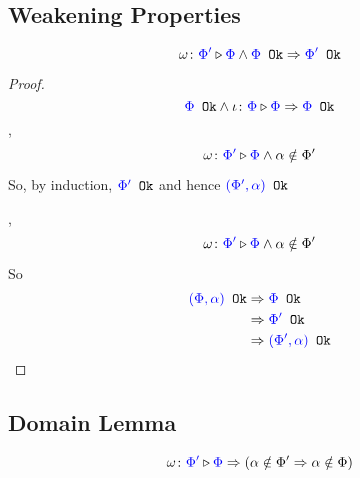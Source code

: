 \documentclass{report}
\begin{document}
        \subsection{Weakening Properties}
        \begin{property}

        \begin{equation}
            \omega \colon {\color{blue}\Phi'} \triangleright {\color {blue} \Phi} \wedge {\color{blue} \Phi} \texttt{ Ok}\Rightarrow {\color{blue} \Phi'} \texttt{ Ok}
        \end{equation}
        \end{property}
        \begin{framed}
            
            \begin{proof}
    
            \subcase{$\i$}
            $${\color{blue} \Phi} \texttt{ Ok} \wedge\iota \colon {\color{blue}\Phi} \triangleright {\color {blue} \Phi} \Rightarrow {\color{blue} \Phi} \texttt{ Ok}$$ 
            \subcase{$\w\pi$}
            \bi,
            \begin{equation}
                \omega \colon {\color{blue}\Phi'} \triangleright {\color {blue} \Phi} \wedge \alpha\notin\Phi'
            \end{equation}
    
            So, by induction, ${\color{blue} \Phi'} \texttt{ Ok}$ and hence ${\color{blue} (\Phi', \alpha)} \texttt{ Ok}$
    
            \subcase{$\w\x$}
            \bi, 
            \begin{equation}
                \omega \colon {\color{blue}\Phi'} \triangleright {\color {blue} \Phi} \wedge \alpha\notin\Phi'
            \end{equation}
    
            So
            \begin{align*}
                {\color{blue} (\Phi, \alpha)} \texttt{ Ok} & \Rightarrow {\color{blue} \Phi} \texttt{ Ok} \\
                & \Rightarrow {\color{blue} \Phi'} \texttt{ Ok}\\
                & \Rightarrow {\color{blue} (\Phi', \alpha)} \texttt{ Ok}\\
            \end{align*}
    
            \end{proof}
        \end{framed}

        \begin{property}

        \subsection{Domain Lemma}
        $$\omega \colon {\color{blue}\Phi'} \triangleright {\color {blue} \Phi} \Rightarrow (\alpha\notin\Phi' \Rightarrow \alpha\notin\Phi)$$
        \end{property}
\end{document}
